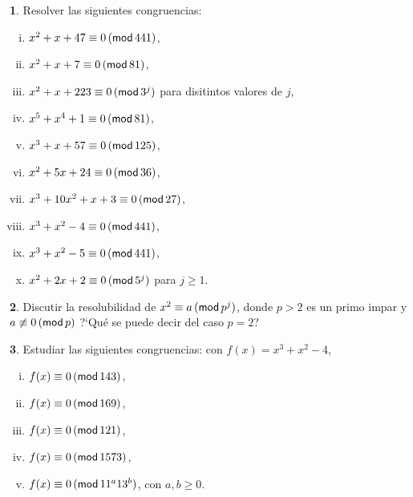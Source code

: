 \theoremstyle{definition}
\newtheorem{ejerHensel}{\ejername}[section]


\begin{ejerHensel}
	Resolver las siguientes congruencias:
	\begin{enumerate}[(i)]
		\item $x^2+x+47\equiv 0\tmodulo[441]$,
		\item $x^2+x+7\equiv 0\tmodulo[81]$,
		\item $x^2+x+223\equiv 0\tmodulo[3^j]$
			para disitintos valores de $j$,
		\item $x^5+x^4+1\equiv 0\tmodulo[81]$,
		\item $x^3+x+57\equiv 0\tmodulo[125]$,
		\item $x^2+5x+24\equiv 0\tmodulo[36]$,
		\item $x^3+10x^2+x+3\equiv 0\tmodulo[27]$,
		\item $x^3+x^2-4\equiv 0\tmodulo[441]$,
		\item $x^3+x^2-5\equiv 0\tmodulo[441]$,
		\item $x^2+2x+2\equiv 0\tmodulo[5^j]$
			para $j\geq 1$.
	\end{enumerate}
\end{ejerHensel}

\begin{ejerHensel}
	Discutir la resolubilidad de $x^2\equiv a\tmodulo[p^j]$,
	donde $p>2$ es un primo impar y $a\not\equiv 0\tmodulo[p]$
	?`Qu\'e se puede decir del caso $p=2$?
\end{ejerHensel}

\begin{ejerHensel}
	Estudiar las siguientes congruencias: con $f(x)=x^3+x^2-4$,
	\begin{enumerate}[(i)]
		\item $f(x)\equiv 0\tmodulo[143]$,
		\item $f(x)\equiv 0\tmodulo[169]$,
		\item $f(x)\equiv 0\tmodulo[121]$,
		\item $f(x)\equiv 0\tmodulo[1573]$,
		\item $f(x)\equiv 0\tmodulo[11^a 13^b]$,
			con $a,b\geq 0$.
	\end{enumerate}
\end{ejerHensel}

